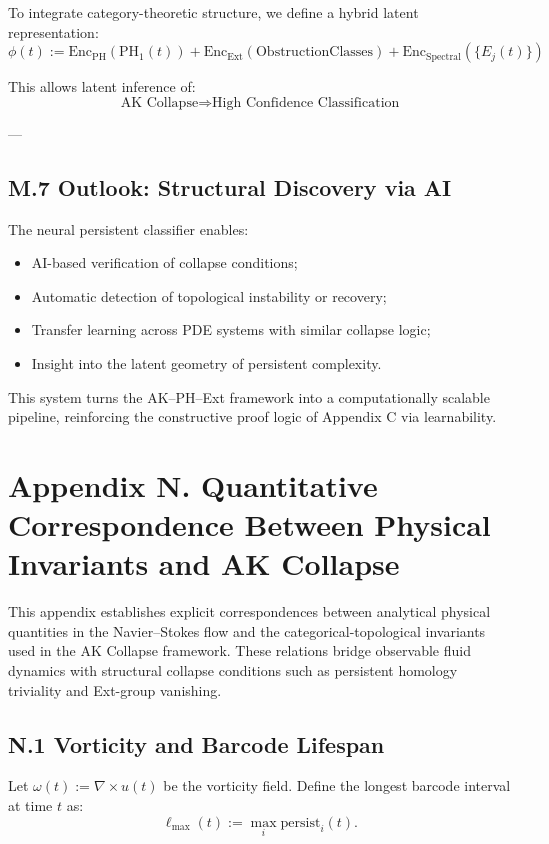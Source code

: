 \documentclass[11pt]{article}
\theoremstyle{definition}
\begin{document}
To integrate category-theoretic structure, we define a hybrid latent representation:
\[
\phi(t) := \mathrm{Enc}_{\mathrm{PH}}(\mathrm{PH}_1(t)) + \mathrm{Enc}_{\mathrm{Ext}}(\mathrm{Obstruction Classes}) + \mathrm{Enc}_{\text{Spectral}}(\{E_j(t)\})
\]

This allows latent inference of:
\[
\text{AK Collapse} \Rightarrow \text{High Confidence Classification}
\]

---

\subsection*{M.7 Outlook: Structural Discovery via AI}

The neural persistent classifier enables:
\begin{itemize}
  \item AI-based verification of collapse conditions;
  \item Automatic detection of topological instability or recovery;
  \item Transfer learning across PDE systems with similar collapse logic;
  \item Insight into the latent geometry of persistent complexity.
\end{itemize}

This system turns the AK–PH–Ext framework into a computationally scalable pipeline, reinforcing the constructive proof logic of Appendix C via learnability.

\section*{Appendix N. Quantitative Correspondence Between Physical Invariants and AK Collapse}

This appendix establishes explicit correspondences between analytical physical quantities in the Navier--Stokes flow and the categorical-topological invariants used in the AK Collapse framework. These relations bridge observable fluid dynamics with structural collapse conditions such as persistent homology triviality and Ext-group vanishing.

\subsection*{N.1 Vorticity and Barcode Lifespan}

Let \( \omega(t) := \nabla \times u(t) \) be the vorticity field. Define the longest barcode interval at time \( t \) as:
\[
\ell_{\max}(t) := \max_{i} \mathrm{persist}_i(t).
\]
\end{document}
